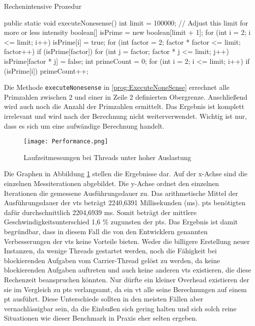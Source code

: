     \begin{program} [H]
        \caption{Rechenintensive Prozedur}
        \label{prog:ExecuteNoneSense}
    \begin{JavaCode}[language=Java, numbers=left]
public static void executeNonesense() {
    int limit = 100000; // Adjust this limit for more or less intensity
    boolean[] isPrime = new boolean[limit + 1];
    for (int i = 2; i <= limit; i++) 
        isPrime[i] = true;
    for (int factor = 2; factor * factor <= limit; factor++) {
        if (isPrime[factor]) {
            for (int j = factor; factor * j <= limit; j++) 
                isPrime[factor * j] = false;
        }
    }
    int primeCount = 0;
    for (int i = 2; i <= limit; i++) {
        if (isPrime[i])
            primeCount++;
    }
}\end{JavaCode}
    \end{program}

    Die Methode \texttt{executeNonesense} in \ref{prog:ExecuteNoneSense} errechnet alle Primzahlen zwischen 2 und einer in Zeile 2 definierten Obergrenze. Anschließend wird 
    auch noch die Anzahl der Primzahlen ermittelt. Das Ergebnis ist komplett irrelevant und wird nach der Berechnung nicht weiterverwendet. Wichtig ist nur, dass es sich um
    eine aufwändige Berechnung handelt.

    \begin{figure}[H]
        \centering
        \texttt{[image: Performance.png]}
        \caption{Laufzeitmessungen bei Threads unter hoher Auslastung}
        \label{fig:Performance}
    \end{figure}

    Die Graphen in Abbildung \ref{fig:Performance} stellen die Ergebnisse dar. Auf der x-Achse sind die einzelnen Messiterationen abgebildet. Die y-Achse ordnet den einzelnen Iterationen die gemessene
    Ausführungsdauer zu.
    Das arithmetische Mittel der Ausführungsdauer der \Glspl{vt} beträgt 2240,6391 Millisekunden (ms). 
    \Glspl{pt} benötigten dafür durchschnittlich 2204,6939 ms. Somit beträgt der mittlere Geschwindigkeitsunterschied 1,6 \% zugunsten der \Glspl{pt}.
    Das Ergebnis ist damit begründbar, dass in diesem Fall die von den Entwicklern genannten Verbesserungen der \Glspl{vt} keine Vorteile bieten. Weder die billigere
    Erstellung neuer Instanzen, da wenige Threads gestartet werden, noch die Fähigkeit bei blockierenden Aufgaben vom Carrier-Thread gelöst zu werden, da keine blockierenden Aufgaben auftreten und
    auch keine anderen \Glspl{vt} existieren, die diese Rechenzeit beanspruchen könnten. Nur dürfte ein kleiner Overhead existieren der sie im Vergleich zu \Glspl{pt} verlangsamt, da ein \gls{vt} alle seine
    Berechnungen auf einem \gls{pt} ausführt.
    Diese Unterschiede sollten in den meisten Fällen aber vernachlässigbar sein, da die Einbußen sich gering halten und sich solch reine Situationen wie dieser Benchmark in Praxis eher selten 
    ergeben.




